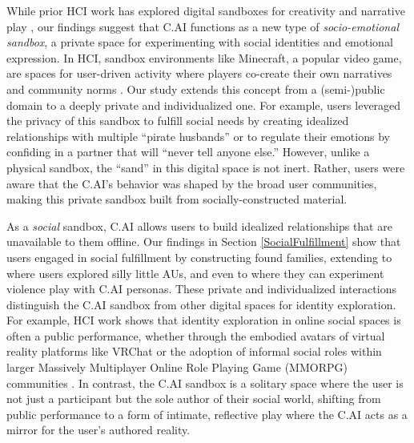\documentclass[sigconf, nonacm]{acmart}
\begin{document}
While prior HCI work has explored digital sandboxes for creativity and narrative play \cite{shi2025need, duh2010narrative, roo2017inner}, our findings suggest that C.AI functions as a new type of \textit{socio-emotional sandbox}, a private space for experimenting with social identities and emotional expression. In HCI, sandbox environments like Minecraft, a popular video game, are spaces for user-driven activity where players co-create their own narratives and community norms \cite{tekinbacs2021designing, slovak2018mediating}. Our study extends this concept from a (semi-)public domain to a deeply private and individualized one. For example, users leveraged the privacy of this sandbox to fulfill social needs by creating idealized relationships with multiple ``pirate husbands'' or to regulate their emotions by confiding in a partner that will ``never tell anyone else.'' However, unlike a physical sandbox, the ``sand'' in this digital space is not inert. Rather, users were aware that the C.AI's behavior was shaped by the broad user communities, making this private sandbox built from socially-constructed material.

As a \textit{social} sandbox, C.AI allows users to build idealized relationships that are unavailable to them offline. Our findings in Section \ref{SocialFulfillment} show that users engaged in social fulfillment by constructing found families, extending to where users explored silly little AUs, and even to where they can experiment violence play with C.AI personas. These private and individualized interactions distinguish the C.AI sandbox from other digital spaces for identity exploration. For example, HCI work shows that identity exploration in online social spaces is often a public performance, whether through the embodied avatars of virtual reality platforms like VRChat \cite{freeman2021body, freeman2022acting} or the adoption of informal social roles within larger Massively Multiplayer Online Role Playing Game (MMORPG) communities \cite{xie2022roleseer}. In contrast, the C.AI sandbox is a solitary space where the user is not just a participant but the sole author of their social world, shifting from public performance to a form of intimate, reflective play where the C.AI acts as a mirror for the user's authored reality.
\end{document}
